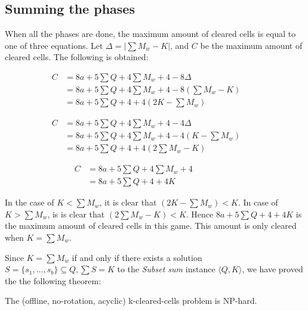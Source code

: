 \subsection{Summing the phases}

When all the phases are done, the maximum amount of cleared cells is equal to one of three equations. Let $\Delta = |\sum M_w - K|$, and $C$ be the maximum amount of cleared cells. The following is obtained:

\begin{equation} \tag{$K < \sum M_w$}
\begin{split}
C & = 8a + 5 \sum Q + 4 \sum M_w + 4 - 8 \Delta  \\
& = 8a + 5 \sum Q + 4 \sum M_w + 4 - 8 \left( \sum M_w - K\right) \phantom{+ 4K} \\
& = 8a + 5 \sum Q + 4 + 4 \left(2K - \sum M_w \right)
\end{split}
\end{equation}

\begin{equation} \tag{$K > \sum M_w$}
\begin{split}
C & = 8a + 5 \sum Q + 4 \sum M_w + 4 - 4 \Delta \\
& = 8a + 5 \sum Q + 4 \sum M_w + 4 - 4 \left( K - \sum M_w \right) \phantom{+ 4K} \\
& = 8a + 5 \sum Q + 4 + 4 \left(2 \sum M_w - K \right)
\end{split}
\end{equation}

\begin{equation} \tag{$K = \sum M_w$}
\begin{split}
C & = 8a + 5 \sum Q + 4 \sum M_w + 4 \phantom{- 8 \Delta} \\
& = 8a + 5 \sum Q + 4 + 4K \phantom{8 \left(\sum M_w + K \right)}
\end{split}
\end{equation}

In the case of $K < \sum M_w$, it is clear that $\left(2K - \sum M_w \right) < K$. In case of $K > \sum M_w$, is is clear that $\left(2 \sum M_w - K \right) < K$. Hence $8a + 5 \sum Q + 4 + 4K$ is the maximum amount of cleared cells in this game. This amount is only cleared when $K = \sum M_w$.

Since $K = \sum M_w$ if and only if there exists a solution $S = \{s_1, \ldots, s_b \} \subseteq Q, \sum S = K$ to the \textit{Subset sum} instance $\langle Q, K \rangle$, we have proved the the following theorem: \\

\begin{thm}
\label{thm:nphard}
The (offline, no-rotation, acyclic) k-cleared-cells problem is NP-hard.
\end{thm}
